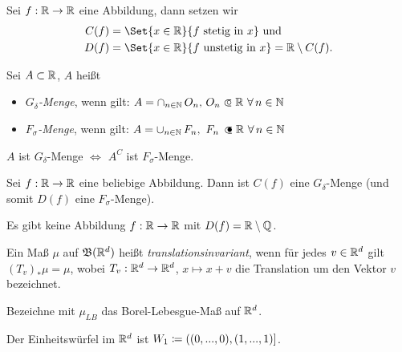 \documentclass{cheat-sheet}
\newcommand{\Bor}{\mathfrak{B}} %
\theoremstyle{definition}
\begin{document}
\begin{nota}
  Sei $f : \mathbb{R} \to \mathbb{R}$ eine Abbildung, dann setzen wir
  \begin{align*}
    C(f) &= \Set{ x \in \R }{ f \text{ stetig in } x } \text{ und}\\
    D(f) &= \Set{ x \in \R }{ f \text{ unstetig in } x } = \R \setminus C(f).
  \end{align*}
\end{nota}

\begin{defn}
  Sei $A \subset \mathbb{R}$, $A$ heißt
  \begin{itemize}
    \item \emph{$G_{\delta}$-Menge}, wenn gilt: $A = \cap_{n \in \N}\,O_n, \, O_n \opn \R\ \forall\,n \in \N$
    \item \emph{$F_{\sigma}$-Menge}, wenn gilt: $A = \cup_{n \in \N}\,F_n, \,\, F_n \, \cls \R\ \forall\,n \in \N$
  \end{itemize}
\end{defn}

\begin{bem}
  $A $ ist $G_\delta$-Menge $\iff$ $A^C$ ist $F_\sigma$-Menge.
\end{bem}

\begin{satz}[Young]
  Sei $f : \mathbb{R} \to \mathbb{R}$ eine beliebige Abbildung. Dann ist $C(f)$ eine $G_\delta$-Menge (und somit $D(f)$ eine $F_\sigma$-Menge).
\end{satz}

\begin{kor}
  Es gibt keine Abbildung $f : \mathbb{R} \to \mathbb{R}$ mit $D(f) = \mathbb{R} \setminus \mathbb{Q}$.
\end{kor}


\begin{defn}
  Ein Maß $\mu$ auf $\Bor(\R^d)$ heißt \emph{translationsinvariant}, wenn für jedes $v \in \mathbb{R}^d$ gilt $(T_v)_* \mu = \mu$, wobei $T_v : \mathbb{R}^d \to \mathbb{R}^d$, $x \mapsto x + v$ die Translation um den Vektor $v$ bezeichnet.
\end{defn}

\begin{nota}
  Bezeichne mit $\mu_{LB}$ das Borel-Lebesgue-Maß auf $\mathbb{R}^d$.
\end{nota}

\begin{nota}
  Der Einheitswürfel im $\mathbb{R}^d$ ist $W_1 \coloneqq \left( (0, ..., 0), (1, ..., 1) \right]$.
\end{nota}
\end{document}
